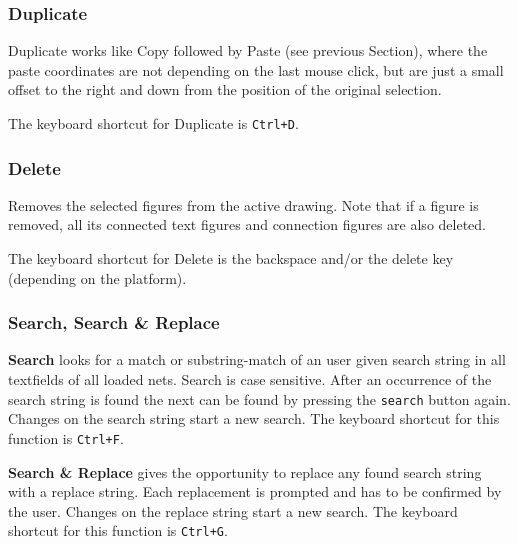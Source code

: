 

\subsubsection{Duplicate}

Duplicate works like Copy followed by Paste (see previous Section),
where the paste coordinates are not depending on the last mouse
click, but are just a small offset to the right and down from the
position of the original selection.

The keyboard shortcut for Duplicate is \texttt{Ctrl+D}.

\subsubsection{Delete}

Removes the selected figures from the active drawing.
Note that if a figure is removed, all its connected text
figures and connection figures are also deleted.

The keyboard shortcut for Delete is the backspace and/or the delete key
(depending on the platform).

\subsubsection{Search, Search \& Replace}

\textbf{Search} looks for a match or substring-match of an
user given search string in all textfields of all loaded nets. Search is
case sensitive. After an occurrence of the search string is found the next
can be found by pressing the \texttt{search} button again. 
Changes on the search string start
a new search.
The keyboard shortcut for this function is \texttt{Ctrl+F}.

\textbf{Search \& Replace} gives the opportunity to replace any found
search string with a replace string. Each replacement is prompted and has
to be confirmed by the user.  Changes on the replace string start a
new search.
The keyboard shortcut for this function is \texttt{Ctrl+G}.

